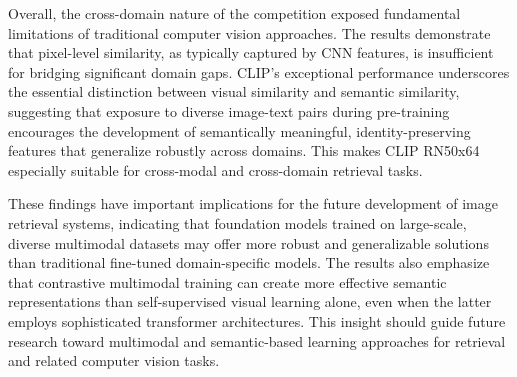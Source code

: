 Overall, the cross-domain nature of the competition exposed fundamental limitations of traditional computer vision approaches. The results demonstrate that pixel-level similarity, as typically captured by CNN features, is insufficient for bridging significant domain gaps. CLIP’s exceptional performance underscores the essential distinction between visual similarity and semantic similarity, suggesting that exposure to diverse image-text pairs during pre-training encourages the development of semantically meaningful, identity-preserving features that generalize robustly across domains. This makes CLIP RN50x64 especially suitable for cross-modal and cross-domain retrieval tasks.

These findings have important implications for the future development of image retrieval systems, indicating that foundation models trained on large-scale, diverse multimodal datasets may offer more robust and generalizable solutions than traditional fine-tuned domain-specific models. The results also emphasize that contrastive multimodal training can create more effective semantic representations than self-supervised visual learning alone, even when the latter employs sophisticated transformer architectures. This insight should guide future research toward multimodal and semantic-based learning approaches for retrieval and related computer vision tasks.

